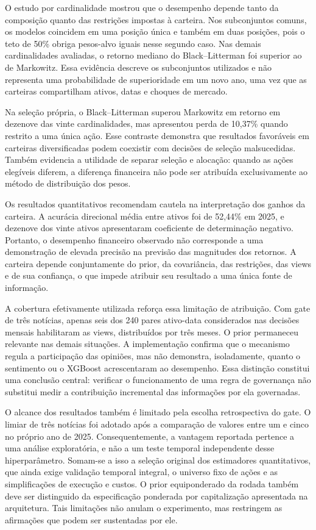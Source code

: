 O estudo por cardinalidade mostrou que o desempenho depende tanto da composição quanto das restrições impostas à carteira. Nos subconjuntos comuns, os modelos coincidem em uma posição única e também em duas posições, pois o teto de 50\% obriga pesos-alvo iguais nesse segundo caso. Nas demais cardinalidades avaliadas, o retorno mediano do Black--Litterman foi superior ao de Markowitz. Essa evidência descreve os subconjuntos utilizados e não representa uma probabilidade de superioridade em um novo ano, uma vez que as carteiras compartilham ativos, datas e choques de mercado.

Na seleção própria, o Black--Litterman superou Markowitz em retorno em dezenove das vinte cardinalidades, mas apresentou perda de 10,37\% quando restrito a uma única ação. Esse contraste demonstra que resultados favoráveis em carteiras diversificadas podem coexistir com decisões de seleção malsucedidas. Também evidencia a utilidade de separar seleção e alocação: quando as ações elegíveis diferem, a diferença financeira não pode ser atribuída exclusivamente ao método de distribuição dos pesos.

Os resultados quantitativos recomendam cautela na interpretação dos ganhos da carteira. A acurácia direcional média entre ativos foi de 52,44\% em 2025, e dezenove dos vinte ativos apresentaram coeficiente de determinação negativo. Portanto, o desempenho financeiro observado não corresponde a uma demonstração de elevada precisão na previsão das magnitudes dos retornos. A carteira depende conjuntamente do prior, da covariância, das restrições, das views e de sua confiança, o que impede atribuir seu resultado a uma única fonte de informação.

A cobertura efetivamente utilizada reforça essa limitação de atribuição. Com gate de três notícias, apenas seis dos 240 pares ativo-data considerados nas decisões mensais habilitaram as views, distribuídos por três meses. O prior permaneceu relevante nas demais situações. A implementação confirma que o mecanismo regula a participação das opiniões, mas não demonstra, isoladamente, quanto o sentimento ou o XGBoost acrescentaram ao desempenho. Essa distinção constitui uma conclusão central: verificar o funcionamento de uma regra de governança não substitui medir a contribuição incremental das informações por ela governadas.

O alcance dos resultados também é limitado pela escolha retrospectiva do gate. O limiar de três notícias foi adotado após a comparação de valores entre um e cinco no próprio ano de 2025. Consequentemente, a vantagem reportada pertence a uma análise exploratória, e não a um teste temporal independente desse hiperparâmetro. Somam-se a isso a seleção original dos estimadores quantitativos, que ainda exige validação temporal integral, o universo fixo de ações e as simplificações de execução e custos. O prior equiponderado da rodada também deve ser distinguido da especificação ponderada por capitalização apresentada na arquitetura. Tais limitações não anulam o experimento, mas restringem as afirmações que podem ser sustentadas por ele.

